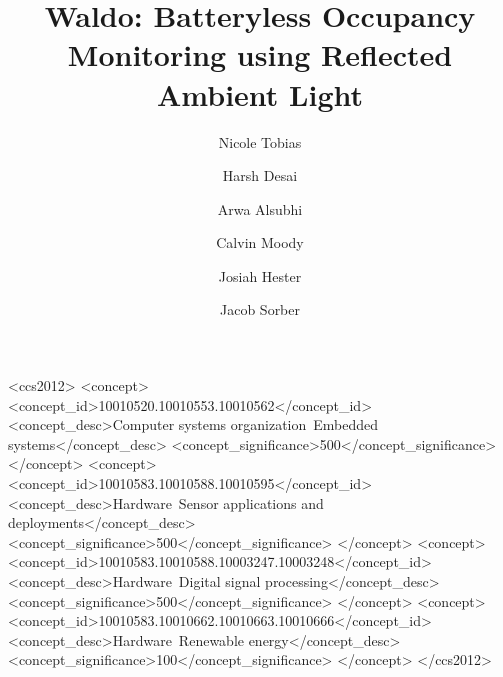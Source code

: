\documentclass[manuscript, screen, anonymous=false]{acmart}
\newcommand{\sysnameraw}{Waldo}
\newcommand{\sysname}{\sysnameraw\xspace}
\begin{document}


\title[Batteryless Occupancy Monitoring with \sysname]{\sysname: Batteryless Occupancy Monitoring using Reflected Ambient Light}


\author{Nicole Tobias}  %

\author{Harsh Desai}  %

\author{Arwa Alsubhi}  %

\author{Calvin Moody}  %

\author{Josiah Hester}  %

\author{Jacob Sorber}  %

\renewcommand{\shortauthors}{N. Tobias et al.}


\begin{abstract}

\end{abstract}

\ifsubmit

\begin{CCSXML}
<ccs2012>
      <concept>
       <concept_id>10010520.10010553.10010562</concept_id>
       <concept_desc>Computer systems organization~Embedded systems</concept_desc>
       <concept_significance>500</concept_significance>
       </concept>
   <concept>
       <concept_id>10010583.10010588.10010595</concept_id>
       <concept_desc>Hardware~Sensor applications and deployments</concept_desc>
       <concept_significance>500</concept_significance>
       </concept>
   <concept>
       <concept_id>10010583.10010588.10003247.10003248</concept_id>
       <concept_desc>Hardware~Digital signal processing</concept_desc>
       <concept_significance>500</concept_significance>
       </concept>
   <concept>
       <concept_id>10010583.10010662.10010663.10010666</concept_id>
       <concept_desc>Hardware~Renewable energy</concept_desc>
       <concept_significance>100</concept_significance>
       </concept>
 </ccs2012>
\end{CCSXML}
\end{document}
